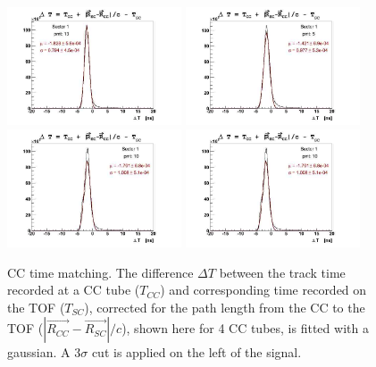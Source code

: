 \vspace{1cm}
\begin{figure}[h]
  \centering
		\includegraphics[width=0.46\textwidth]{img/cct_slice6_fit_sect1.jpg}
		\includegraphics[width=0.46\textwidth]{img/cct_slice9_fit_sect1.jpg}
		\includegraphics[width=0.46\textwidth]{img/cct_slice11_fit_sect1.jpg}
		\includegraphics[width=0.46\textwidth]{img/cct_slice14_fit_sect1.jpg}
		\caption{CC time matching. The difference $\Delta T$ between the track time recorded
               at a CC tube ($T_{CC}$) and corresponding time recorded on the TOF ($T_{SC}$),
               corrected for the path length from the CC to the TOF ($|\vec{R_{CC}}-\vec{R_{SC}}|/c$),
               shown here for 4 CC tubes, is fitted with a gaussian.
               A 3$\sigma$ cut is applied on the left of the signal.}
 		\label{fig:cc_time_slices}
\end{figure}


